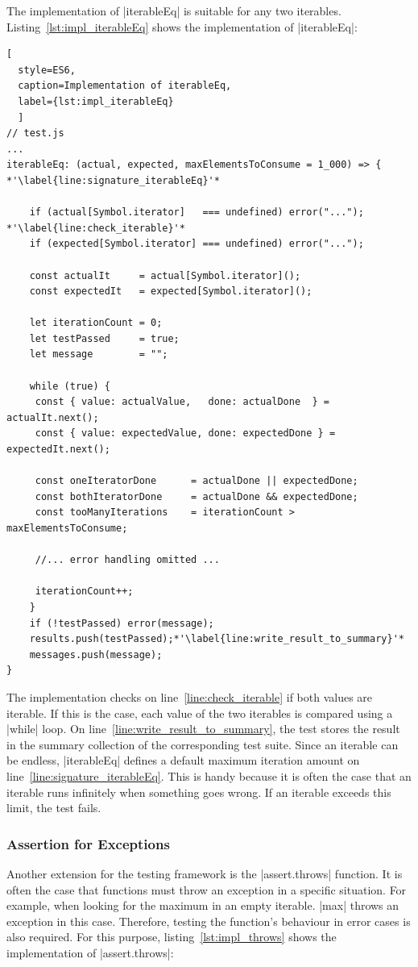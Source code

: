 The implementation of |iterableEq| is suitable for any two iterables.
Listing~\ref{lst:impl_iterableEq} shows the implementation of |iterableEq|:

\begin{lstlisting}[
  style=ES6, 
  caption=Implementation of iterableEq,
  label={lst:impl_iterableEq}
  ]
// test.js
...
iterableEq: (actual, expected, maxElementsToConsume = 1_000) => { *'\label{line:signature_iterableEq}'*

    if (actual[Symbol.iterator]   === undefined) error("..."); *'\label{line:check_iterable}'*
    if (expected[Symbol.iterator] === undefined) error("...");

    const actualIt     = actual[Symbol.iterator]();
    const expectedIt   = expected[Symbol.iterator]();

    let iterationCount = 0;
    let testPassed     = true;
    let message        = "";

    while (true) {
     const { value: actualValue,   done: actualDone  } = actualIt.next();
     const { value: expectedValue, done: expectedDone } = expectedIt.next();

     const oneIteratorDone      = actualDone || expectedDone;
     const bothIteratorDone     = actualDone && expectedDone;
     const tooManyIterations    = iterationCount > maxElementsToConsume;

     //... error handling omitted ...

     iterationCount++;
    }
    if (!testPassed) error(message);
    results.push(testPassed);*'\label{line:write_result_to_summary}'*
    messages.push(message);
}
\end{lstlisting}

The implementation checks on line~\ref{line:check_iterable} if both values are
iterable. If this is the case, each value of the two iterables is compared
using a |while| loop. On line~\ref{line:write_result_to_summary}, the
test stores the result in the summary collection of the corresponding test
suite.
\newline
Since an iterable can be endless, |iterableEq| defines a default maximum
iteration amount on line~\ref{line:signature_iterableEq}.  This is handy
because it is often the case that an iterable runs infinitely when something
goes wrong. If an iterable exceeds this limit, the test fails.

\subsubsection{Assertion for Exceptions}
\label{subsub:Assertion for Exceptions}
Another extension for the testing framework is the |assert.throws| function. It
is often the case that functions must throw an exception in a specific
situation. For example, when looking for the maximum in an empty iterable.
|max| throws an exception in this case. Therefore, testing the function's
behaviour in error cases is also required. For this purpose,
listing~\ref{lst:impl_throws} shows the implementation of |assert.throws|:

